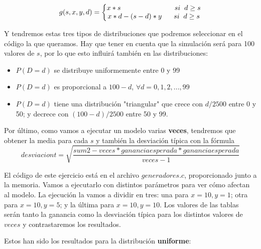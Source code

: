 \documentclass[11pt,a4paper]{report}
\begin{document}
\begin{equation}
	g(s,x,y,d)=\left\{\begin{matrix}
	x*s\hspace{27mm}si\hspace{2mm}d\geq s\\ 
	x*d-(s-d)*y\hspace{6mm}si\hspace{2mm}d\geq s
	\end{matrix}\right.
\end{equation}

Y tendremos estas tres tipos de distribuciones que podremos seleccionar en el código la que queramos. Hay que tener en cuenta que la
simulación será para 100 valores de $s$, por lo que esto influirá también en las distribuciones:

\begin{itemize}
	\item $P(D=d)$ se distribuye uniformemente entre 0 y 99
	\item $P(D=d)$ es proporcional a $100-d$, $\forall d=0,1,2,...,99$
	\item $P(D=d)$ tiene una distribución "triangular" que crece con $d/2500$ entre 0 y 50; y decrece con $(100-d)/2500$ entre 50 y 99.
\end{itemize}

Por último, como vamos a ejecutar un modelo varias \textbf{veces}, tendremos que obtener la media para cada $s$ y también la desviación
típica con la fórmula
\begin{equation}
	desviaciont=\sqrt{\frac{sum2-veces*gananciaesperada*gananciaesperada}{veces-1}}
\end{equation}

El código de este ejercicio está en el archivo $generadores.c$, proporcionado junto a la memoria. Vamos a ejecutarlo con distintos parámetros
para ver cómo afectan al modelo. La ejecución la vamos a dividir en tres: una para $x=10, y=1$; otra para $x=10, y=5$; y la última para
$x=10, y=10$. Los valores de las tablas serán tanto la ganancia como la desviación típica para los distintos valores de $veces$ y
contrastaremos los resultados.

Estos han sido los resultados para la distribución \textbf{uniforme}:
\end{document}
